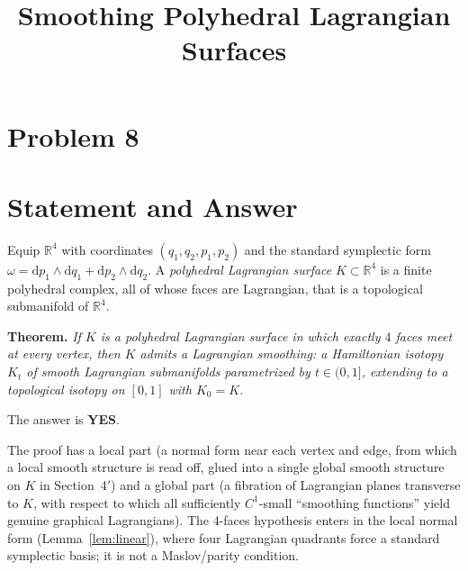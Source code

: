 \clearpage
\section*{Problem 8}
\begingroup
\hypersetup{colorlinks=true,
            linkcolor=blue!50!black,
            citecolor=blue!50!black,
            urlcolor=blue!50!black}
\newcommand{\qeightR}{\mathbb{R}}
\newcommand{\qeightZ}{\mathbb{Z}}
\newcommand{\qeightSm}{\mathscr S}
\newcommand{\qeightLdual}{L^{\vee}}
\newcommand{\qeightdd}{\mathrm d}
\newcommand{\qeightLag}{\Lambda}
\newcommand{\qeightHess}{\operatorname{Hess}}
\newtheorem{qeighttheorem}{Theorem}
\newtheorem{qeightproposition}{Proposition}
\newtheorem{qeightlemma}{Lemma}
\newtheorem{qeightcorollary}{Corollary}
\theoremstyle{definition}
\newtheorem{qeightdefinition}{Definition}
\newtheorem{qeightremark}{Remark}
\title{Smoothing Polyhedral Lagrangian Surfaces}
\author{}
\date{}
\maketitle


\section*{Statement and Answer}

Equip $\qeightR^4$ with coordinates $(q_1,q_2,p_1,p_2)$ and the standard symplectic
form $\omega=\qeightdd p_1\wedge \qeightdd q_1+\qeightdd p_2\wedge \qeightdd q_2$. A \emph{polyhedral
Lagrangian surface} $K\subset\qeightR^4$ is a finite polyhedral complex, all of whose
faces are Lagrangian, that is a topological submanifold of $\qeightR^4$.

\medskip
\noindent\textbf{Theorem.} \emph{If $K$ is a polyhedral Lagrangian surface in
which exactly $4$ faces meet at every vertex, then $K$ admits a Lagrangian
smoothing: a Hamiltonian isotopy $K_t$ of smooth Lagrangian submanifolds
parametrized by $t\in(0,1]$, extending to a topological isotopy on $[0,1]$ with
$K_0=K$.}

\medskip
\noindent The answer is \textbf{YES}.

\medskip
The proof has a local part (a normal form near each vertex and edge, from which
a local smooth structure is read off, glued into a single global smooth structure
on $K$ in Section~4$'$) and a global part (a fibration of
Lagrangian planes transverse to $K$, with respect to which all sufficiently
$C^1$-small ``smoothing functions'' yield genuine graphical Lagrangians). The
$4$-faces hypothesis enters in the local normal form (Lemma~\ref{lem:linear}),
where four Lagrangian quadrants force a standard symplectic basis; it is not a
Maslov/parity condition.

